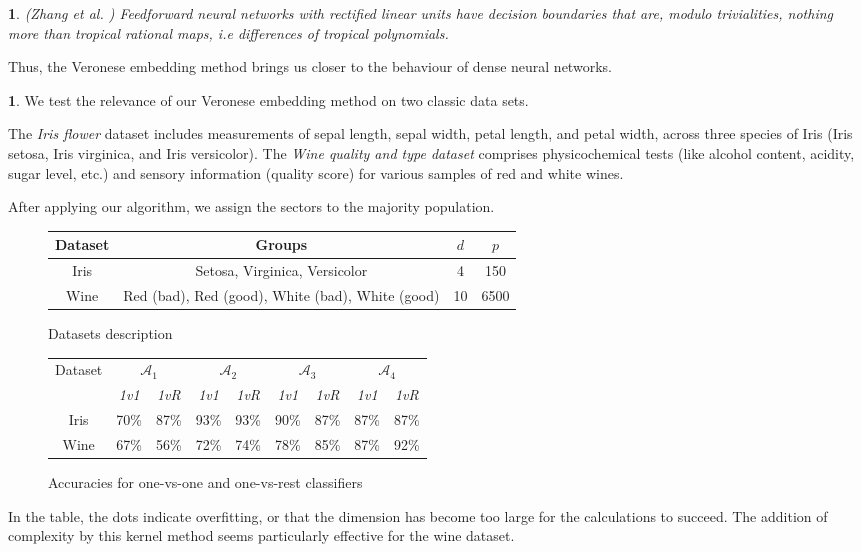 \documentclass[oneside,english,a4paper]{amsart}
\numberwithin{equation}{section}
\numberwithin{figure}{section}
\theoremstyle{plain}
\theoremstyle{definition}
\theoremstyle{plain}
\newtheorem{prop}[thm]{\protect\propositionname}
\theoremstyle{remark}
\theoremstyle{plain}
\theoremstyle{definition}
\newtheorem{example}[thm]{\protect\examplename}
\theoremstyle{definition}
\providecommand{\propositionname}{Proposition}
\providecommand{\examplename}{Example}
\begin{document}
\begin{prop}
\emph{(Zhang et al. \cite{zhang2018tropical})} Feedforward neural networks with rectified linear units have decision boundaries that are, modulo trivialities, nothing more than tropical rational maps, i.e differences of tropical polynomials. 
\end{prop}

Thus, the Veronese embedding method brings us closer to the behaviour of dense neural networks.

\begin{example}
We test the relevance of our Veronese embedding method on two classic data sets.

The \emph{Iris flower} dataset includes measurements of sepal length, sepal width, petal length, and petal width, across three species of Iris (Iris setosa, Iris virginica, and Iris versicolor). The \emph{Wine quality and type dataset} comprises physicochemical tests (like alcohol content, acidity,
sugar level, etc.) and sensory information (quality score) for various samples of red and white wines.

After applying our algorithm, we assign the sectors to the majority population.

\begin{figure}[!h]
\begin{tabular}{|c|c|c|c|}
\hline 
Dataset  & Groups  & $d$  & $p$\tabularnewline
\hline 
\hline 
Iris  & Setosa, Virginica, Versicolor  & 4  & 150\tabularnewline
\hline 
Wine  & Red (bad), Red (good), White (bad), White (good)  & 10  & 6500\tabularnewline
\hline 
\end{tabular}

\caption{Datasets description}
\end{figure}

\begin{figure}[!h]
\begin{tabular}{|c|c|c|c|c|c|c|c|c|}
\hline 
\multirow{2}{*}{Dataset} & \multicolumn{2}{c|}{$\mathcal{A}_{1}$} & \multicolumn{2}{c|}{$\mathcal{A}_{2}$} & \multicolumn{2}{c|}{$\mathcal{A}_{3}$} & \multicolumn{2}{c|}{$\mathcal{A}_{4}$}\tabularnewline
\cline{2-9} \cline{3-9} \cline{4-9} \cline{5-9} \cline{6-9} \cline{7-9} \cline{8-9} \cline{9-9} 
 & \emph{1v1}  & \emph{1vR}  & \emph{1v1}  & \emph{1vR}  & \emph{1v1}  & \emph{1vR}  & \emph{1v1}  & \emph{1vR} \tabularnewline
\hline 
Iris  & 70\%  & 87\%  & 93\%  & 93\%  & 90\%  & 87\%  & 87\%  & 87\%\tabularnewline
\hline 
Wine  & 67\%  & 56\%  & 72\%  & 74\%  & 78\%  & 85\%  & 87\%  & 92\%\tabularnewline
\hline 
\end{tabular}

\caption{Accuracies for one-vs-one and one-vs-rest classifiers}
\end{figure}

In the table, the dots indicate overfitting, or that the dimension
has become too large for the calculations to succeed. The addition
of complexity by this kernel method seems particularly effective for
the wine dataset.

\end{example}
\end{document}
